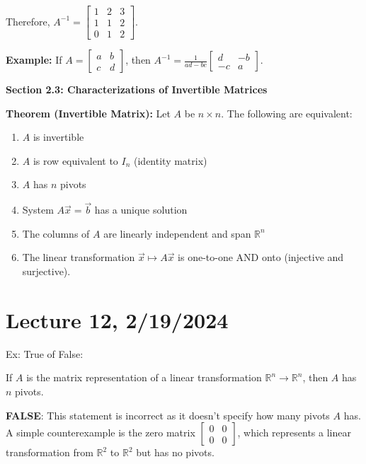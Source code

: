 \documentclass{article}
\begin{document}
Therefore, \( A^{-1} = \begin{bmatrix} 1 & 2 & 3 \\ 1 & 1 & 2 \\ 0 & 1 & 2 \end{bmatrix} \).


\textbf{Example:} If \( A = \begin{bmatrix} a & b \\ c & d \end{bmatrix} \), then \( A^{-1} = \frac{1}{ad-bc} \begin{bmatrix} d & -b \\ -c & a \end{bmatrix} \).



\textbf{Section 2.3: Characterizations of Invertible Matrices}

\textbf{Theorem (Invertible Matrix):} Let \( A \) be \( n \times n \). The following are equivalent:

\begin{enumerate}
    \item \( A \) is invertible
    \item \( A \) is row equivalent to \( I_n \) (identity matrix)
    \item \( A \) has \( n \) pivots
    \item System \( A\vec{x} = \vec{b} \) has a unique solution
    \item The columns of \( A \) are linearly independent and span \( \mathbb{R}^n \)
    \item The linear transformation \( \vec{x} \mapsto A\vec{x} \) is one-to-one AND onto (injective and surjective).
\end{enumerate}



\section{Lecture 12, 2/19/2024}

Ex: True of False:

If \( A \) is the matrix representation of a linear transformation \( \mathbb{R}^n \rightarrow \mathbb{R}^n \), then \( A \) has \( n \) pivots. 

\textbf{FALSE}: This statement is incorrect as it doesn't specify how many pivots \( A \) has. A simple counterexample is the zero matrix \( \begin{bmatrix} 0 & 0 \\ 0 & 0 \end{bmatrix} \), which represents a linear transformation from \( \mathbb{R}^2 \) to \( \mathbb{R}^2 \) but has no pivots.
\end{document}
